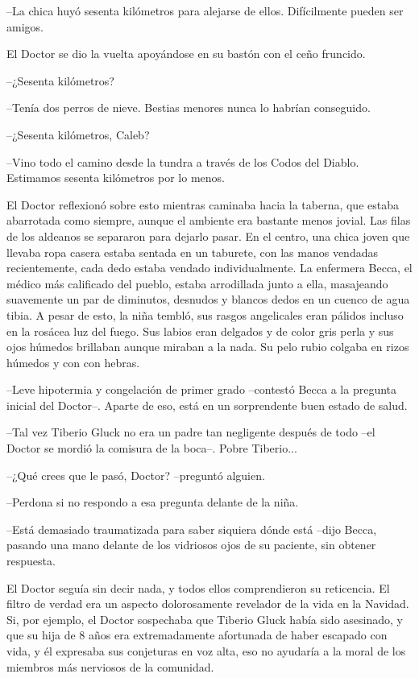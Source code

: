 --La chica huyó sesenta kilómetros para alejarse de ellos. Difícilmente pueden ser amigos.
 
El Doctor se dio la vuelta apoyándose en su bastón con el ceño fruncido.
 
--¿Sesenta kilómetros?
 
--Tenía dos perros de nieve. Bestias menores nunca lo habrían conseguido.
 
--¿Sesenta kilómetros, Caleb?
 
--Vino todo el camino desde la tundra a través de los Codos del Diablo. Estimamos sesenta kilómetros por lo menos.
 
El Doctor reflexionó sobre esto mientras caminaba hacia la taberna, que estaba abarrotada como siempre, aunque el ambiente era bastante menos jovial. Las filas de los aldeanos se separaron para dejarlo pasar. En el centro, una chica joven que llevaba ropa casera estaba sentada en un taburete, con las manos vendadas recientemente, cada dedo estaba vendado individualmente. La enfermera Becca, el médico más calificado del pueblo, estaba arrodillada junto a ella, masajeando suavemente un par de diminutos, desnudos y blancos dedos en un cuenco de agua tibia. A pesar de esto, la niña tembló, sus rasgos angelicales eran pálidos incluso en la rosácea luz del fuego. Sus labios eran delgados y de color gris perla y sus ojos húmedos brillaban aunque miraban a la nada. Su pelo rubio colgaba en rizos húmedos y con con hebras.
 
--Leve hipotermia y congelación de primer grado --contestó Becca a la pregunta inicial del Doctor--. Aparte de eso, está en un sorprendente buen estado de salud.
 
--Tal vez Tiberio Gluck no era un padre tan negligente después de todo --el Doctor se mordió la comisura de la boca--. Pobre Tiberio...
 
--¿Qué crees que le pasó, Doctor? --preguntó alguien.
 
--Perdona si no respondo a esa pregunta delante de la niña.
 
--Está demasiado traumatizada para saber siquiera dónde está --dijo Becca, pasando una mano delante de los vidriosos ojos de su paciente, sin obtener respuesta.
 
El Doctor seguía sin decir nada, y todos ellos comprendieron su reticencia. El filtro de verdad era un aspecto dolorosamente revelador de la vida en la Navidad. Si, por ejemplo, el Doctor sospechaba que Tiberio Gluck había sido asesinado, y que su hija de 8 años era extremadamente afortunada de haber escapado con vida, y él expresaba sus conjeturas en voz alta, eso no ayudaría a la moral de los miembros más nerviosos de la comunidad.
 
